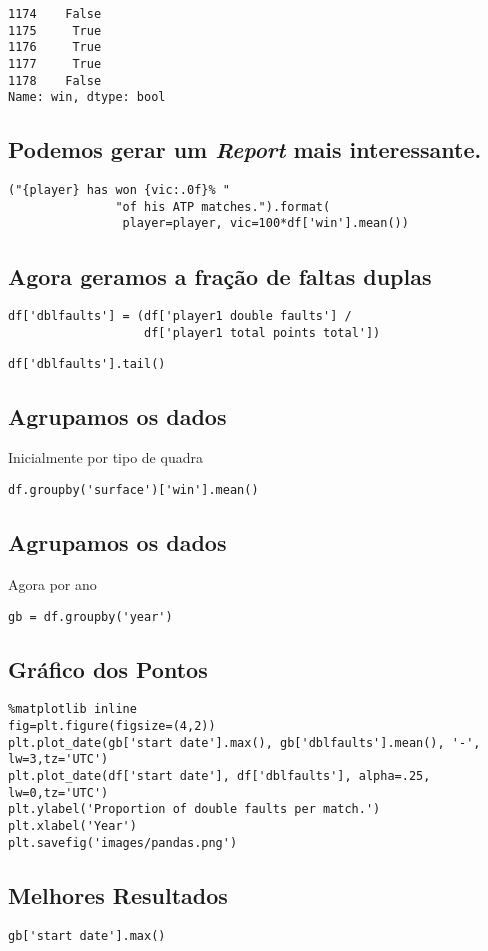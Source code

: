 \documentclass[11pt]{article}
\begin{document}
\begin{verbatim}
1174    False
1175     True
1176     True
1177     True
1178    False
Name: win, dtype: bool
\end{verbatim}

\subsection*{Podemos gerar um \emph{Report} mais interessante.}
\label{sec:org4487018}

\begin{verbatim}
("{player} has won {vic:.0f}% "
               "of his ATP matches.").format(
                player=player, vic=100*df['win'].mean())
\end{verbatim}


\subsection*{Agora geramos a fração de faltas duplas}
\label{sec:org55cec50}
\begin{verbatim}
df['dblfaults'] = (df['player1 double faults'] / 
                   df['player1 total points total'])
\end{verbatim}

\begin{verbatim}
df['dblfaults'].tail()
\end{verbatim}

\subsection*{Agrupamos os dados}
\label{sec:orga292ab8}

Inicialmente por tipo de quadra
\begin{verbatim}
df.groupby('surface')['win'].mean()
\end{verbatim}

\subsection*{Agrupamos os dados}
\label{sec:org9c41ce5}

Agora por ano 

\begin{verbatim}
gb = df.groupby('year')
\end{verbatim}


\subsection*{Gráfico dos Pontos}
\label{sec:org0cf5575}
\begin{verbatim}
%matplotlib inline
fig=plt.figure(figsize=(4,2))
plt.plot_date(gb['start date'].max(), gb['dblfaults'].mean(), '-', lw=3,tz='UTC')
plt.plot_date(df['start date'], df['dblfaults'], alpha=.25, lw=0,tz='UTC')
plt.ylabel('Proportion of double faults per match.')
plt.xlabel('Year')
plt.savefig('images/pandas.png')
\end{verbatim}


\subsection*{Melhores Resultados}
\label{sec:orgd0e3f7d}
\begin{verbatim}
gb['start date'].max()
\end{verbatim}
\end{document}

